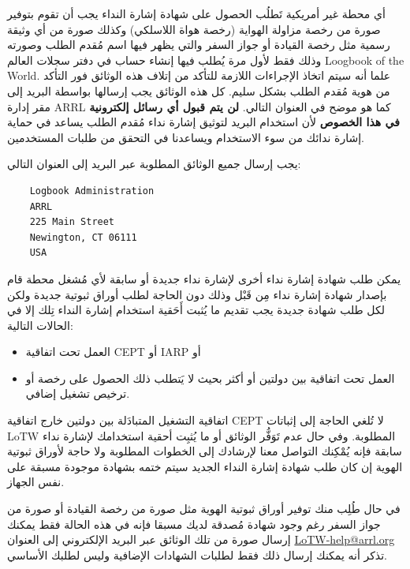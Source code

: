 \documentclass[a4paper,12pt]{article}
\begin{document}
أي محطة غير أمريكية تَطلُب الحصول على شهادة إشارة النداء يجب أن تقوم
بتوفير صورة من رخصة مزاولة الهواية (رخصة هواة اللاسلكي) وكذلك صورة من أي
وثيقة رسمية مثل رخصة القيادة أو جواز السفر والتي يظهر فيها اسم مُقدم
الطلب وصورته وذلك فقط لأول مرة يُطلب فيها إنشاء حساب في دفتر سجلات العالم
\textenglish{Loogbook of the World}. علما أنه سيتم اتخاذ الإجراءات اللازمة للتأكد من
إتلاف هذه الوثائق فور التأكد من هوية مُقدم الطلب بشكل سليم. كل هذه
الوثائق يجب إرسالها بواسطة البريد إلى مقر إدارة \textenglish{ARRL} كما هو موضح في
العنوان التالي. \textbf{لن يتم قبول أي رسائل إلكترونية في هذا الخصوص} لأن استخدام
البريد لتوثيق إشارة نداء مُقدم الطلب يساعد في حماية إشارة ندائك من سوء
الاستخدام ويساعدنا في التحقق من طلبات المستخدمين.

يجب إرسال جميع الوثائق المطلوبة عبر البريد إلى العنوان التالي:
\begin{flushleft}
	\begin{verbatim}
	Logbook Administration
	ARRL
	225 Main Street
	Newington, CT 06111
	USA
	\end{verbatim}
\end{flushleft}

يمكن طلب شهادة إشارة نداء أخرى لإشارة نداء جديدة أو سابقة لأي مُشغل محطة
قام بإصدار شهادة إشارة نداء مِن قَبْل وذلك دون الحاجة لطلب أوراق ثبوتية
جديدة ولكن لكل طلب شهادة جديدة يجب تقديم ما يُثبت أَحَقية استخدام إشارة
النداء تِلك إلا في الحالات التالية:

	\begin{itemize}
		\item
			العمل تحت اتفاقية \textenglish{CEPT} أو \textenglish{IARP} أو
		\item
			العمل تحت اتفاقية بين دولتين أو أكثر بحيث لا يَتطلب ذلك الحصول على رخصة أو ترخيص تشغيل إضافي.
	\end{itemize}

اتفاقية التشغيل المتبادَلة بين دولتين خارج اتفاقية \textenglish{CEPT} لا تُلغي الحاجة
إلى إثباتات \textenglish{LoTW} المطلوبة. وفي حال عدم تَوَفُّر الوثائق أو ما يُثبِت أحقية
استخدامك لإشارة نداء سابقة فإنه يُمْكِنك التواصل معنا لإرشادك إلى الخطوات
المطلوبة ولا حاجة لأوراق ثبوتية الهوية إن كان طلب شهادة إشارة النداء
الجديد سيتم ختمه بشهادة موجودة مسبقة على نفس الجهاز.

في حال طُلِب منك توفير أوراق ثبوتية الهوية مثل صورة من رخصة القيادة أو
صورة من جواز السفر رغم وجود شهادة مُصدقة لديك مسبقا فإنه في هذه الحالة
فقط يمكنك إرسال صورة من تلك الوثائق عبر البريد الإلكتروني إلى العنوان
\href{mailto:LoTW-help@arrl.org}{LoTW-help@arrl.org} تذكر أنه يمكنك إرسال ذلك فقط لطلبات الشهادات
الإضافية وليس لطلبك الأساسي.
\end{document}
